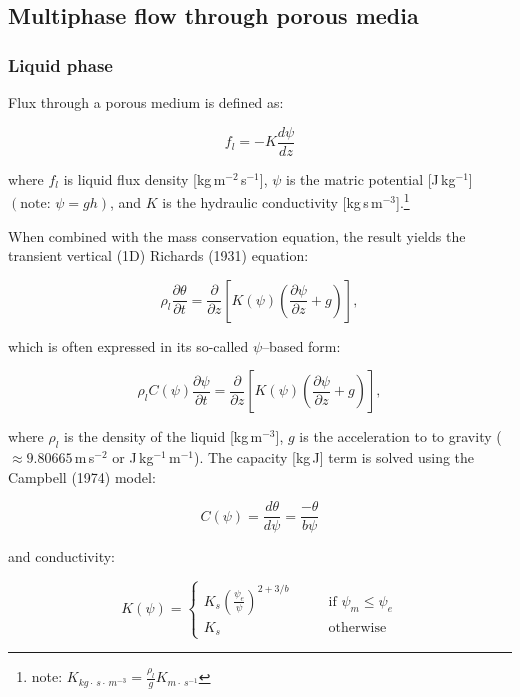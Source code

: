 \documentclass[10pt, letterpapr]{article}
\begin{document}
\subsection*{Multiphase flow through porous media}

\subsubsection*{Liquid phase}

Flux through a porous medium is defined as:

\[
	f_l=-K\frac{d\psi}{dz}
\]

\noindent where $f_l$ is liquid flux density [kg\,m$^{-2}$\,s$^{-1}$], $\psi$ is the matric potential [J\,kg$^{-1}$] $\left(\text{note: }\psi=gh\right)$, and $K$ is the hydraulic conductivity [kg\,s\,m$^{-3}$].\footnote{note: $K_{kg\cdot\,s\cdot\,m^{-3}}=\frac{\rho_l}{g}K_{m\cdot\,s^{-1}}$}

When combined with the mass conservation equation, the result yields the transient vertical (1D) Richards (1931) equation: 


\[
	\rho_l\frac{\partial\theta}{\partial t}=\frac{\partial}{\partial z}\left[K(\psi)\left(\frac{\partial\psi}{\partial z}+g\right)\right],
\]

\noindent which is often expressed in its so-called $\psi$--based form:

\[
	\rho_lC(\psi)\frac{\partial\psi}{\partial t}=\frac{\partial}{\partial z}\left[K(\psi)\left(\frac{\partial\psi}{\partial z}+g\right)\right],
\]

\noindent where $\rho_l$ is the density of the liquid [kg\,m$^{-3}$], $g$ is the acceleration to to gravity ($\approx9.80665$\,m\,s$^{-2}$ or J\,kg$^{-1}$\,m$^{-1}$). The capacity [kg\,J] term is solved using the Campbell (1974) model: %

\[
	C(\psi)=\frac{d\theta}{d\psi}=\frac{-\theta}{b\psi}
\]

\noindent and conductivity:

\[
	K(\psi)=
	\begin{cases}
		K_s\left(\frac{\psi_e}{\psi}\right)^{2+3/b}  \qquad &\text{if $\psi_m\leq\psi_e$} \\
		K_s  &\text{otherwise}
	\end{cases}
\]
\end{document}
